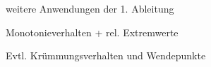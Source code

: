 \documentclass[
    ngerman,
    color=1b,
    load_common,
    leqno,
    dark_mode,
    boxarc,
    solution=true,
]{rubos-tuda-template}
\begin{document}
\clearpage
\begin{task}[points=1]{weitere Anwendungen der 1. Ableitung}

\end{task}
\begin{task}[points=1]{Monotonieverhalten + rel. Extremwerte}

\end{task}
\begin{task}[points=1]{Evtl. Krümmungsverhalten und Wendepunkte}

\end{task}








\end{document}
